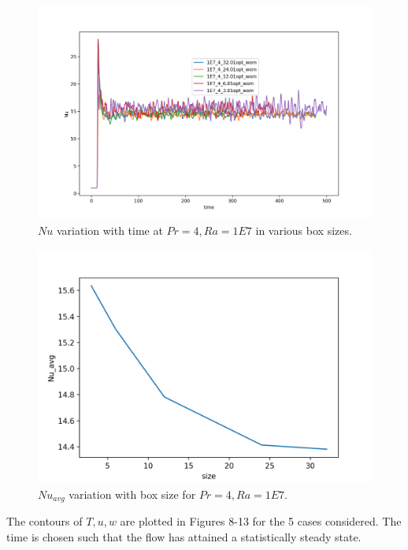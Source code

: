 \documentclass[12pt]{article}
\begin{document}
      \begin{figure}[!htb]
      	\includegraphics[width=\linewidth]{Nu_1E7_4_boxes.png}
      	\caption{$Nu$ variation with time at $Pr = 4, Ra = 1E7$ in various box sizes.}
      	\label{fig:fig6}
      \end{figure} 
      
      \begin{figure}[!htb]
      	\includegraphics[width=\linewidth]{Nu_size.png}
      	\caption{$Nu_{avg}$ variation with box size for $Pr = 4, Ra = 1E7$.}
      	\label{fig:fig7}
      \end{figure} 
      
      The contours of $T,u,w$ are plotted in Figures 8-13 for the 5 cases considered. The time is chosen such that the flow has attained a statistically steady state.
      
\end{document}
